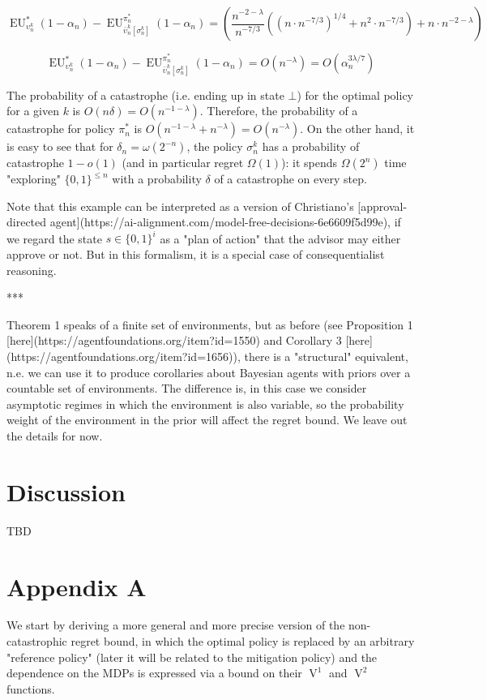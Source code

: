 \documentclass[a4paper]{article}
\newcommand{\Bool}{\{0,1\}}
\newcommand{\AP}[1]{\left(#1\right)}
\newcommand{\AB}[1]{\left[#1\right]}
\newcommand{\V}{\operatorname{V}}
\newcommand{\EU}{\operatorname{EU}}
\begin{document}
$$\EU_{\upsilon_n^k}^*(1-\alpha_n) - \EU_{\bar{\upsilon}_n^k\AB{\sigma_n^k}}^{\pi_n^*}(1-\alpha_n) = \AP{\frac{n^{-2-\lambda}}{n^{-7/3}}\AP{\AP{n \cdot n^{-7/3}}^{1/4}+n^2 \cdot n^{-7/3}}+n \cdot n^{-2-\lambda}}$$

$$\EU_{\upsilon_n^k}^*(1-\alpha_n) - \EU_{\bar{\upsilon}_n^k\AB{\sigma_n^k}}^{\pi_n^*}(1-\alpha_n) = O\AP{n^{-\lambda}}=O\AP{\alpha_n^{3\lambda/7}}$$

The probability of a catastrophe (i.e. ending up in state $\bot$) for the optimal policy for a given $k$ is $O\AP{n\delta}=O\AP{n^{-1-\lambda}}$. Therefore, the probability of a catastrophe for policy $\pi_n^*$ is $O\AP{n^{-1-\lambda}+n^{-\lambda}}=O\AP{n^{-\lambda}}$. On the other hand, it is easy to see that for $\delta_n = \omega\AP{2^{-n}}$, the policy $\sigma_n^k$ has a probability of catastrophe $1-o(1)$ (and in particular  regret $\Omega(1)$): it spends $\Omega(2^n)$ time "exploring" $\Bool^{\leq n}$ with a probability $\delta$ of a catastrophe on every step.

Note that this example can be interpreted as a version of Christiano's [approval-directed agent](https://ai-alignment.com/model-free-decisions-6e6609f5d99e), if we regard the state $s \in \Bool^{i}$ as a "plan of action" that the advisor may either approve or not. But in this formalism, it is a special case of consequentialist reasoning.

***

Theorem 1 speaks of a finite set of environments, but as before (see Proposition 1 [here](https://agentfoundations.org/item?id=1550) and Corollary 3 [here](https://agentfoundations.org/item?id=1656)), there is a "structural" equivalent, n.e. we can use it to produce corollaries about Bayesian agents with priors over a countable set of environments. The difference is, in this case we consider asymptotic regimes in which the environment is also variable, so the probability weight of the environment in the prior will affect the regret bound. We leave out the details for now.

\section{Discussion}

TBD

\section{Appendix A}

We start by deriving a more general and more precise version of the non-catastrophic regret bound, in which the optimal policy is replaced by an arbitrary "reference policy" (later it will be related to the mitigation policy) and the dependence on the MDPs is expressed via a bound on their $\V^1$ and $\V^2$ functions.
\end{document}
